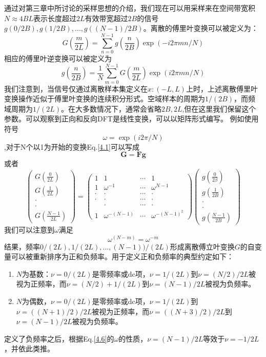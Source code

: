 \documentclass[10pt, UTF8]{ctexart}%
\numberwithin{equation}{section}
\numberwithin{figure}{section}
\newcommand{\InsertEqution}[2]{\begin{equation}
  \label{#1}
   #2
 \end{equation}}
\newcommand{\RefEq}[1]{Eq.\ref{#1}}
\newcommand{\InsertInlineEq}[1]{$#1$}
\newcommand{\InsertItem}[1]{\begin{enumerate} #1 \end{enumerate}}
\begin{document}
\begin{sloppypar}
通过对第三章中所讨论的采样思想的介绍，我们现在可以用采样来在空间带宽积\InsertInlineEq{N\approx4BL}表示长度超过\InsertInlineEq{2L}有效带宽超过\InsertInlineEq{2B}的信号\InsertInlineEq{g(0/2B),g(1/2B),...,g((N-1)/2B)}。离散的傅里叶变换可以被定义为：\InsertEqution{4.1}{G\left(\frac{m}{2 L}\right)=\sum_{n=0}^{N-1} g\left(\frac{n}{2 B}\right) \exp (-i 2 \pi m n / N)}
相应的傅里叶逆变换可以被定义为\InsertEqution{4.2}{g\left(\frac{n}{2 B}\right)=\frac{1}{N} \sum_{m=0}^{N-1} G\left(\frac{m}{2 L}\right) \exp (i 2 \pi m n / N)}
我们注意到，当信号仅通过离散样本集定义在\InsertInlineEq{x:(-L,L)}上时，上述离散傅里叶变换操作近似于傅里叶变换的连续积分形式。空域样本的周期为\InsertInlineEq{1/(2B)}，而频域周期为\InsertInlineEq{1/(2L)}。在大多数情况下，通常会省略\InsertInlineEq{2B,2L},但在这里我们保留这个参数。可以观察到正向和反向DFT是线性变换，可以以矩阵形式编写。 例如使用符号\InsertEqution{4.3}{\omega=\exp (i 2 \pi / N)},对于N个以1为开始的变换\RefEq{4.1}可以写成\InsertEqution{4.4}{\mathbf{G}=\mathbf{F} \mathbf{g}}或者\InsertEqution{4.5}{\left(\begin{array}{c}
  G\left(\frac{0}{2 L}\right) \\
  G\left(\frac{1}{2 L}\right) \\
  \cdot \\
  \cdot \\
  G\left(\frac{N-1}{2 L}\right)
  \end{array}\right)=\left(\begin{array}{cccc}
  1 & 1 & \cdots & 1 \\
  1 & \omega^{-1} & \cdots & \omega^{N-1} \\
  \cdot & \cdot & \cdots & \cdot \\
  \cdot & \cdot & \cdots & \cdot \\
  & \cdot & \cdots & \cdot \\
  1 & \omega^{-(N-1)} & \cdots & \omega^{-(N-1)^{2}}
  \end{array}\right)\left(\begin{array}{c}
  g\left(\frac{0}{2 \beta}\right) \\
  g\left(\frac{1}{2 B}\right) \\
  \cdot \\
  \cdot \\
  g\left(\frac{N-1}{2 B}\right)
  \end{array}\right)}
我们可以注意到\InsertInlineEq{\omega}满足\InsertEqution{4.6}{\omega^{(N-m)}=\omega^{-m}}
结果，频率\InsertInlineEq{0/(2L),1/(2L),...,(N-1))/(2L)}形成离散傅立叶变换\InsertInlineEq{G}的自变量可以被重新排序为正和负频率。用于定义正和负频率的典型约定如下：
\InsertItem{\item \InsertInlineEq{N}为基数：\InsertInlineEq{\nu = 0/(2L)}是零频率或dc项，\InsertInlineEq{\nu=1/(2L)}到\InsertInlineEq{\nu=(N/2)/2L}被视为正频率，而\InsertInlineEq{\nu=(N/2)+1/(2L)}到\InsertInlineEq{\nu=(N-1)/2L}被视为负频率。
\item \InsertInlineEq{N}为偶数，\InsertInlineEq{\nu = 0/(2L)}是零频率或dc项，\InsertInlineEq{\nu=1/(2L)}到\InsertInlineEq{\nu=((N+1)/2)/2L}被视为正频率，而\InsertInlineEq{\nu=((N+3)/2)/2L}到\InsertInlineEq{\nu=(N-1)/2L}被视为负频率。}
定义了负频率之后，根据\RefEq{4.6}的\InsertInlineEq{\omega}的性质，\InsertInlineEq{\nu=(N-1)/2L}等效于\InsertInlineEq{\nu=-1/2L}，并依此类推。

\end{sloppypar}
\end{document}
